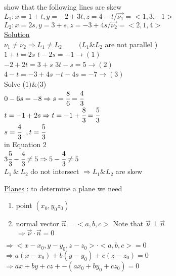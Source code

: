 \begin{example}
 show that the following lines are skew \\
$L_1 : x = 1+t , y=-2+3t , z=4-t / \overrightarrow{\nu_{1}} = <1,3,-1> $\\
$L_2 : x = 2s , y=3+s , z=-3+4s / \overrightarrow{\nu_{2}} = <2,1,4>$\\
{\color{smalt(darkpowderblue)}\underline{Solution}}\\
$\nu_{1} \neq \nu_{2} \Rightarrow L_{1} \neq L_{2} \hspace{1cm}(L_{1} \& L_2 $ are not parallel )\\
$1+t = 2s $ \hspace{4cm} $t-2s=-1 \rightarrow (1) $\\
$-2+2t = 3+s$ \hspace{3.1cm}$3t-s=5 \rightarrow (2) $\\
$4-t = -3 +4s $\hspace{3.1cm} $-t -4s=-7 \rightarrow (3)$\\
{Solve ($1) \& (3$)} \\
$ 0-6s=-8 \Rightarrow s=\cfrac{8}{6} = \cfrac{4}{3}$\\
$t=-1+2s \Rightarrow t=-1+\cfrac{8}{3} = \cfrac{5}{3}$\\
$s=\cfrac{4}{3} ~~, t=\cfrac{5}{3}$\\
in Equation 2 \\ $ 3\cfrac{5}{3} - \cfrac{4}{3} \neq  5  \Rightarrow 5-\cfrac{4}{3} \neq 5$\\
$L_{1}~ \& ~ L_2$  do not intersect $\Rightarrow L_{1}\& L_2$ are skew \end{example}
 \noindent{\color{smalt(darkpowderblue)}\rule{\linewidth}{.2mm}}
{\color{smalt(darkpowderblue)}\underline{Planes}} : to determine a plane we need \begin{enumerate}
    \item point $(x_0 , y_0 z_0 )$
    \item normal vector $\overrightarrow{n} = <a,b,c>$ \hspace{2cm} Note that $\overrightarrow{\nu} \perp \overrightarrow{n}$\\
$\Rightarrow \overrightarrow{\nu} \cdot \overrightarrow{n} = 0$
\end{enumerate}
$\Rightarrow <x-x_0 , y-y_0 , z-z_0> \cdot <a,b,c> = 0$\\
$\Rightarrow  a(x-x_0) + b(y-y_0) +c(z-z_0) = 0$\\
$\Rightarrow  ax + by + cz + -(ax_0 + by_0 +cz_0) = 0$\\

